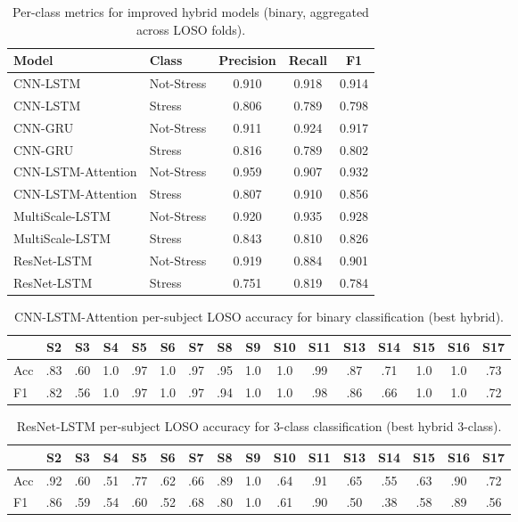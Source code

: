\documentclass[11pt]{article}
\begin{document}
\begin{table}[H]
\centering
\caption{Per-class metrics for improved hybrid models (binary, aggregated across LOSO folds).}
\label{tab:hybrid-binary-perclass}
\begin{tabular}{llccc}
\toprule
\textbf{Model} & \textbf{Class} & \textbf{Precision} & \textbf{Recall} & \textbf{F1} \\
\midrule
CNN-LSTM           & Not-Stress & 0.910 & 0.918 & 0.914 \\
CNN-LSTM           & Stress     & 0.806 & 0.789 & 0.798 \\
\midrule
CNN-GRU            & Not-Stress & 0.911 & 0.924 & 0.917 \\
CNN-GRU            & Stress     & 0.816 & 0.789 & 0.802 \\
\midrule
CNN-LSTM-Attention & Not-Stress & 0.959 & 0.907 & 0.932 \\
CNN-LSTM-Attention & Stress     & 0.807 & 0.910 & 0.856 \\
\midrule
MultiScale-LSTM    & Not-Stress & 0.920 & 0.935 & 0.928 \\
MultiScale-LSTM    & Stress     & 0.843 & 0.810 & 0.826 \\
\midrule
ResNet-LSTM        & Not-Stress & 0.919 & 0.884 & 0.901 \\
ResNet-LSTM        & Stress     & 0.751 & 0.819 & 0.784 \\
\bottomrule
\end{tabular}
\end{table}

\begin{table}[H]
\centering
\caption{CNN-LSTM-Attention per-subject LOSO accuracy for binary classification (best hybrid).}
\label{tab:attention-persub}
\small
\begin{tabular}{lccccccccccccccc}
\toprule
& S2 & S3 & S4 & S5 & S6 & S7 & S8 & S9 & S10 & S11 & S13 & S14 & S15 & S16 & S17 \\
\midrule
Acc & .83 & .60 & 1.0 & .97 & 1.0 & .97 & .95 & 1.0 & 1.0 & .99 & .87 & .71 & 1.0 & 1.0 & .73 \\
F1  & .82 & .56 & 1.0 & .97 & 1.0 & .97 & .94 & 1.0 & 1.0 & .98 & .86 & .66 & 1.0 & 1.0 & .72 \\
\bottomrule
\end{tabular}
\end{table}

\begin{table}[H]
\centering
\caption{ResNet-LSTM per-subject LOSO accuracy for 3-class classification (best hybrid 3-class).}
\label{tab:resnetlstm-persub}
\small
\begin{tabular}{lccccccccccccccc}
\toprule
& S2 & S3 & S4 & S5 & S6 & S7 & S8 & S9 & S10 & S11 & S13 & S14 & S15 & S16 & S17 \\
\midrule
Acc & .92 & .60 & .51 & .77 & .62 & .66 & .89 & 1.0 & .64 & .91 & .65 & .55 & .63 & .90 & .72 \\
F1  & .86 & .59 & .54 & .60 & .52 & .68 & .80 & 1.0 & .61 & .90 & .50 & .38 & .58 & .89 & .56 \\
\bottomrule
\end{tabular}
\end{table}
\end{document}
